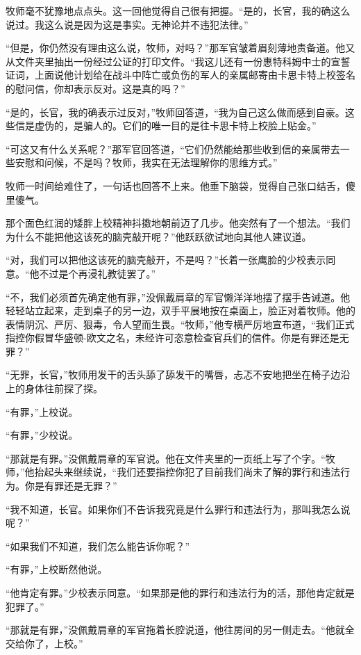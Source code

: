     牧师毫不犹豫地点点头。这一回他觉得自己很有把握。“是的，长官，我的确这么说过。我这么说是因为这是事实。无神论并不违犯法律。”
 


    “但是，你仍然没有理由这么说，牧师，对吗？”那军官皱着眉刻薄地责备道。他又从文件夹里抽出一份经过公证的打印文件。“我这儿还有一份惠特科姆中士的宣誓证词，上面说他计划给在战斗中阵亡或负伤的军人的亲属邮寄由卡思卡特上校签名的慰问信，你却表示反对。这是真的吗？”

    “是的，长官，我的确表示过反对，”牧师回答道，“我为自己这么做而感到自豪。这些信是虚伪的，是骗人的。它们的唯一目的是往卡思卡特上校脸上贴金。”

    “可这又有什么关系呢？”那军官回答道，“它们仍然能给那些收到信的亲属带去一些安慰和问候，不是吗？牧师，我实在无法理解你的思维方式。”

    牧师一时间给难住了，一句话也回答不上来。他垂下脑袋，觉得自己张口结舌，傻里傻气。

    那个面色红润的矮胖上校精神抖擞地朝前迈了几步。他突然有了一个想法。“我们为什么不能把他这该死的脑壳敲开呢？”他跃跃欲试地向其他人建议道。

    “对，我们可以把他这该死的脑壳敲开，不是吗？”长着一张鹰脸的少校表示同意。“他不过是个再浸礼教徒罢了。”

    “不，我们必须首先确定他有罪，”没佩戴肩章的军官懒洋洋地摆了摆手告诫道。他轻轻站立起来，走到桌子的另一边，双手平展地按在桌面上，脸正对着牧师。他的表情阴沉、严厉、狠毒，令人望而生畏。“牧师，”他专横严厉地宣布道，“我们正式指控你假冒华盛顿-欧文之名，未经许可恣意检查官兵们的信件。你是有罪还是无罪？”

    “无罪，长官，”牧师用发干的舌头舔了舔发干的嘴唇，忐忑不安地把坐在椅子边沿上的身体往前探了探。

    “有罪，”上校说。

    “有罪，”少校说。

    “那就是有罪。”没佩戴肩章的军官说。他在文件夹里的一页纸上写了个字。“牧师，”他抬起头来继续说，“我们还要指控你犯了目前我们尚未了解的罪行和违法行为。你是有罪还是无罪？”

    “我不知道，长官。如果你们不告诉我究竟是什么罪行和违法行为，那叫我怎么说呢？”

    “如果我们不知道，我们怎么能告诉你呢？”

    “有罪，”上校断然他说。

    “他肯定有罪。”少校表示同意。“如果那是他的罪行和违法行为的活，那他肯定就是犯罪了。”

    “那就是有罪，”没佩戴肩章的军官拖着长腔说道，他往房间的另一侧走去。“他就全交给你了，上校。”

